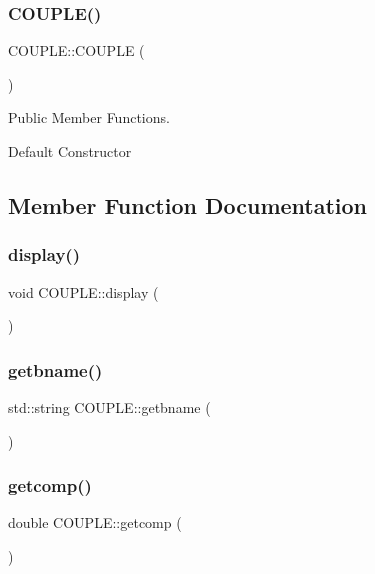 \subsubsection{\texorpdfstring{C\+O\+U\+P\+L\+E()}{COUPLE()}}
{\footnotesize\ttfamily C\+O\+U\+P\+L\+E\+::\+C\+O\+U\+P\+LE (\begin{DoxyParamCaption}{ }\end{DoxyParamCaption})\hspace{0.3cm}{\ttfamily [inline]}}



Public Member Functions. 

Default Constructor 

\subsection{Member Function Documentation}
\mbox{\label{class_c_o_u_p_l_e_ab0ccebe80c96e08fa53e01d766e45c6e}} 
\subsubsection{\texorpdfstring{display()}{display()}}
{\footnotesize\ttfamily void C\+O\+U\+P\+L\+E\+::display (\begin{DoxyParamCaption}{ }\end{DoxyParamCaption})}

\mbox{\label{class_c_o_u_p_l_e_a9a1fdc2aae018a1572dc94b7530583f1}} 
\subsubsection{\texorpdfstring{getbname()}{getbname()}}
{\footnotesize\ttfamily std\+::string C\+O\+U\+P\+L\+E\+::getbname (\begin{DoxyParamCaption}{ }\end{DoxyParamCaption})}

\mbox{\label{class_c_o_u_p_l_e_ae20b039a8a7ea8389e32621a422ba2f3}} 
\subsubsection{\texorpdfstring{getcomp()}{getcomp()}}
{\footnotesize\ttfamily double C\+O\+U\+P\+L\+E\+::getcomp (\begin{DoxyParamCaption}{ }\end{DoxyParamCaption})}

